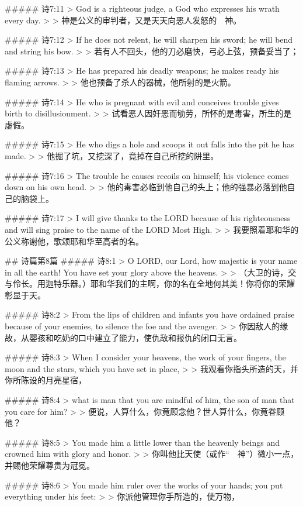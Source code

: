 ##### 诗7:11
> God is a righteous judge, a God who expresses his wrath every day.
>
> 神是公义的审判者，又是天天向恶人发怒的　神。


##### 诗7:12
> If he does not relent, he will sharpen his sword; he will bend and string his bow.
>
> 若有人不回头，他的刀必磨快，弓必上弦，预备妥当了；


##### 诗7:13
> He has prepared his deadly weapons; he makes ready his flaming arrows.
>
> 他也预备了杀人的器械，他所射的是火箭。


##### 诗7:14
> He who is pregnant with evil and conceives trouble gives birth to disillusionment.
>
> 试看恶人因奸恶而劬劳，所怀的是毒害，所生的是虚假。


##### 诗7:15
> He who digs a hole and scoops it out falls into the pit he has made.
>
> 他掘了坑，又挖深了，竟掉在自己所挖的阱里。


##### 诗7:16
> The trouble he causes recoils on himself; his violence comes down on his own head.
>
> 他的毒害必临到他自己的头上；他的强暴必落到他自己的脑袋上。


##### 诗7:17
> I will give thanks to the LORD because of his righteousness and will sing praise to the name of the LORD Most High.
>
> 我要照着耶和华的公义称谢他，歌颂耶和华至高者的名。


## 诗篇第8篇
##### 诗8:1
> O LORD, our Lord, how majestic is your name in all the earth! You have set your glory above the heavens.
>
> （大卫的诗，交与伶长。用迦特乐器。）耶和华我们的主啊，你的名在全地何其美！你将你的荣耀彰显于天。


##### 诗8:2
> From the lips of children and infants you have ordained praise because of your enemies, to silence the foe and the avenger.
>
> 你因敌人的缘故，从婴孩和吃奶的口中建立了能力，使仇敌和报仇的闭口无言。


##### 诗8:3
> When I consider your heavens, the work of your fingers, the moon and the stars, which you have set in place,
>
> 我观看你指头所造的天，并你所陈设的月亮星宿，


##### 诗8:4
> what is man that you are mindful of him, the son of man that you care for him?
>
> 便说，人算什么，你竟顾念他？世人算什么，你竟眷顾他？


##### 诗8:5
> You made him a little lower than the heavenly beings and crowned him with glory and honor.
>
> 你叫他比天使（或作“　神”）微小一点，并赐他荣耀尊贵为冠冕。


##### 诗8:6
> You made him ruler over the works of your hands; you put everything under his feet:
>
> 你派他管理你手所造的，使万物，



